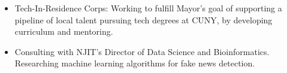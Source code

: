 \documentclass[a4paper,10pt]{memoir} %
\begin{document}
\Sep %

\begin{itemize}
	\item Tech-In-Residence Corps: Working to fulfill Mayor's goal of 
	supporting a pipeline of local talent pursuing tech degrees at CUNY, by 
	developing curriculum and mentoring.

	\item Consulting with NJIT's Director of Data Science and 
	Bioinformatics. Researching machine learning algorithms for fake news 
	detection.
\end{itemize}

\Sep %

\end{document}
